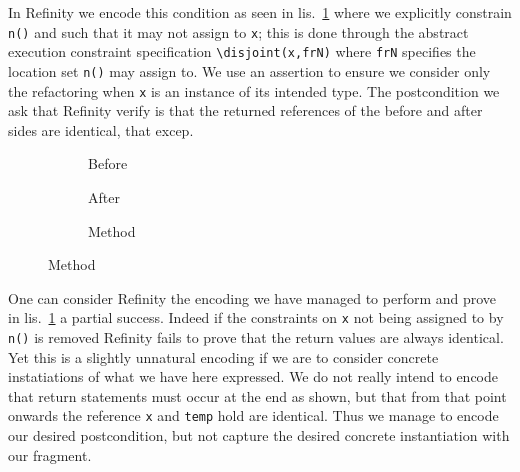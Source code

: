 In Refinity we encode this condition as seen in lis.~\ref{lst:ExtractVariable-refinity} where we explicitly constrain \lstinline[style=refinity]|n()| and
such that it may not assign to \lstinline[style=refinity]|x|; this is done through the abstract execution constraint specification \lstinline[style=refinity]|\disjoint(x,frN)|
where \lstinline[style=refinity]|frN| specifies the location set \lstinline[style=refinity]|n()| may assign to. We use an assertion to ensure we consider only the refactoring
when \lstinline[style=refinity]|x| is an instance of its intended type. The  postcondition we ask that Refinity
verify is that the returned references of the before and after sides are identical, that excep.
\begin{figure}[!h]
  \centering
  \begin{subfigure}[b]{.34\linewidth}
    
    \caption{Before}
  \end{subfigure}\hspace{1cm}
  \begin{subfigure}[b]{.34\linewidth}
    
    \caption{After}
  \end{subfigure}\vspace{1mm}
  \begin{subfigure}[b]{.39\linewidth}
    
    \caption{Method}
  \end{subfigure}
\label{lst:ExtractVariable-refinity}
\end{figure}
One can consider Refinity the encoding we have managed to perform and prove in lis.~\ref{lst:ExtractVariable-refinity} a partial success. Indeed if the constraints on
\lstinline[style=refinity]|x| not being assigned to by \lstinline[style=refinity]|n()| is removed Refinity fails to prove that the return values are always identical.
Yet this is a slightly unnatural encoding if we are to consider concrete instatiations of what we have here expressed. We do not really intend to encode that return
statements must occur at the end as shown, but that from that point onwards the reference \lstinline[style=refinity]|x| and \lstinline[style=refinity]|temp| hold
are identical. Thus we manage to encode our desired postcondition, but not capture the desired concrete instantiation with our fragment.
